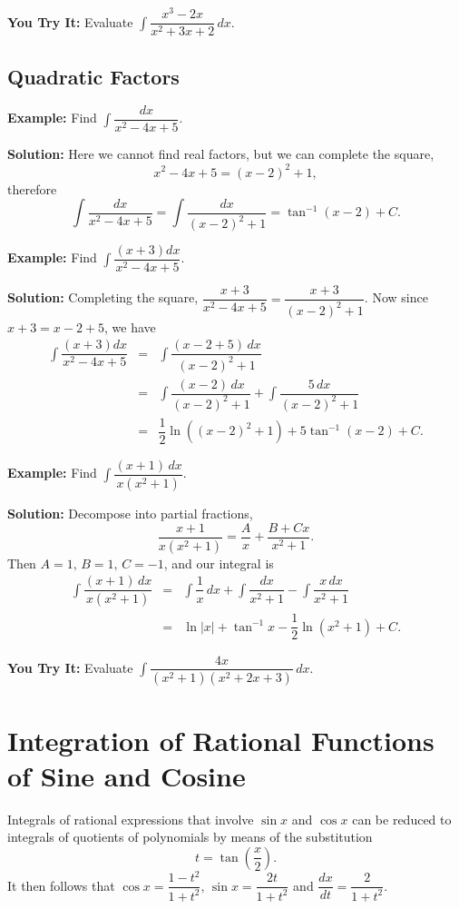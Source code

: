 \documentclass[titlepage,a4paper,12pt]{report}
\begin{document}
 \noindent \textbf{You Try It:} Evaluate $\displaystyle \int \dfrac{x^3-2x}{x^2+3x+2}\, dx$.
 \subsection{Quadratic Factors}
 \textbf{Example:} Find $\displaystyle \int \dfrac{dx}{x^2-4x+5}$.
 
 \noindent \textbf{Solution:} Here we cannot find real factors, but we can complete the square, 
 \begin{equation*}
 x^2-4x+5=(x-2)^2+1, 
 \end{equation*}
 therefore 
 \begin{equation*}
 \int \dfrac{dx}{x^2-4x+5} =\int \dfrac{dx}{(x-2)^2+1}=\tan ^{-1} (x-2) +C.
 \end{equation*}
 
 
 \noindent \textbf{Example:} Find $\displaystyle \int \dfrac{(x+3)dx}{x^2-4x+5}$.
 
 \noindent \textbf{Solution:} Completing the square, $\dfrac{x+3}{x^2-4x+5}=\dfrac{x+3}{(x-2)^2+1}$. Now since $x+3=x-2+5$, we have 
 \begin{eqnarray*}
 \int \dfrac{(x+3)dx}{x^2-4x+5} &=&\int \dfrac{(x-2+5)\, dx}{(x-2)^2+1}\\
 &=& \int \dfrac{(x-2)\, dx}{(x-2)^2+1} +\int \dfrac{5\, dx}{(x-2)^2+1}\\
 &=& \dfrac{1}{2}\ln ((x-2)^2+1)+5\tan ^{-1} (x-2)+C.
 \end{eqnarray*}
 
 \noindent \textbf{Example:} Find $\displaystyle \int \dfrac{(x+1)\, dx}{x(x^2+1)}$.
 
 \noindent \textbf{Solution:} Decompose into partial fractions, 
 \begin{equation*}
 \dfrac{x+1}{x(x^2+1)}=\dfrac{A}{x}+\dfrac{B+Cx}{x^2+1}.
 \end{equation*}
 Then $A=1, \, B=1, \, C=-1$, and our integral is 
 \begin{eqnarray*}
 \int \dfrac{(x+1)\, dx}{x(x^2+1)} &=& \int \dfrac{1}{x}\, dx +\int \dfrac{dx}{x^2+1}-\int \dfrac{x\, dx}{x^2+1}\\
 &=& \ln |x| +\tan ^{-1} x-\dfrac{1}{2}\ln (x^2+1)+C.
 \end{eqnarray*}
 
 \noindent \textbf{You Try It:} Evaluate $\displaystyle \int \dfrac{4x}{(x^2+1)(x^2+2x+3)}\, dx$.
 \section{Integration of Rational Functions of Sine and Cosine}
 Integrals of rational expressions that involve $\sin x$ and $\cos x$ can be reduced to integrals of quotients of polynomials by means of the substitution 
 \begin{equation*}
 t=\tan \left(\dfrac{x}{2}\right).
 \end{equation*}
 It then follows that $\cos x=\dfrac{1-t^2}{1+t^2}, \, \sin x =\dfrac{2t}{1+t^2}$ and $\dfrac{dx}{dt}=\dfrac{2}{1+t^2}$.
 
\end{document}
